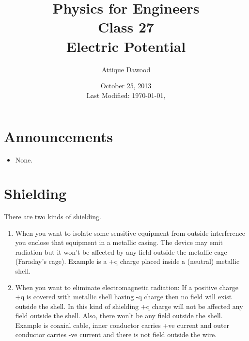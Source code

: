 \documentclass[12pt,a4paper]{article}
\title{\vspace{-3cm}Physics for Engineers\\Class 27\\Electric Potential}
\author{Attique Dawood}
\date{October 25, 2013\\[0.2cm] Last Modified: \today, \currenttime}
\begin{document}
\maketitle
\section{Announcements}
\begin{itemize}
\item None.
\end{itemize}
\section{Shielding}
There are two kinds of shielding.
\begin{enumerate}
\item When you want to isolate some sensitive equipment from outside interference you enclose that equipment in a metallic casing. The device may emit radiation but it won't be affected by any field outside the metallic cage (Faraday's cage). Example is a +q charge placed inside a (neutral) metallic shell.
\item When you want to eliminate electromagnetic radiation: If a positive charge +q is covered with metallic shell having -q charge then no field will exist outside the shell. In this kind of shielding +q charge will not be affected any field outside the shell. Also, there won't be any field outside the shell. Example is coaxial cable, inner conductor carries +ve current and outer conductor carries -ve current and there is not field outside the wire.
\end{enumerate}
\end{document}
